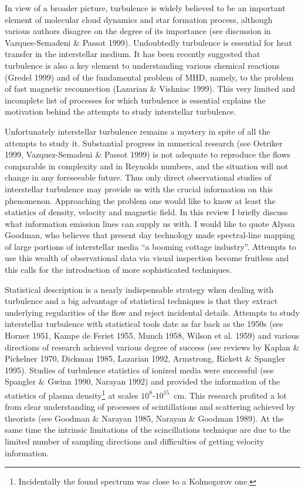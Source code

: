 In view of a broader picture, turbulence is widely believed to
be an important element of molecular cloud dynamics 
and star formation process, although various 
authors disagree on the degree of its importance (see discussion
in Vazques-Semadeni
\& Passot 1999). Undoubtedly turbulence is essential for heat 
transfer in the interstellar medium. It has been recently
suggested that turbulence
is also 
a key element to understanding various chemical reactions (Gredel 1999)
and of the fundamental problem of MHD, namely, to the problem of
fast magnetic reconnection (Lazarian \& Vishniac
1999). This very limited and incomplete list of processes for which
turbulence is essential explains the motivation behind the attempts
to study interstellar turbulence.  


Unfortunately interstellar turbulence remains a mystery in spite of all the
attempts to study it. Substantial progress in numerical research (see
Ostriker 1999, Vazquez-Semadeni \& Passot 1999) is not adequate to reproduce
the flows comparable in complexity and in Reynolds numbers, and the
situation will not change 
in any foreseeable future. Thus only direct observational 
studies of interstellar
turbulence may provide us with the crucial
information on this phenomenon. Approaching the problem one would like
to know at least the statistics of density, velocity and magnetic field.
In this review I briefly discuss what information emission lines can
supply us with. I would like to quote Alyssa Goodman, who believes
that present day technology made spectral-line
mapping of large portions of interstellar media 
``a booming cottage industry''. Attempts to use this wealth of observational
data via visual inspection become fruitless and this calls for the 
introduction of more sophisticated techniques. 


Statistical description is a nearly indispensable strategy when
dealing with turbulence and a big advantage of statistical techniques
is that they extract underlying regularities of the flow and reject
incidental details. 
Attempts to study interstellar turbulence with statistical tools
date as far back as the 1950s
(see Horner 1951, Kampe de Feriet 1955, Munch 1958, 
Wilson et al. 1959) and various directions
of research achieved various degree of success (see reviews by
Kaplan \& Pickelner 1970, Dickman 1985, Lazarian 1992, Armstrong, Rickett
\& Spangler 1995). 
Studies of turbulence statistics of ionized media were successful
(see Spangler \& Gwinn 1990, Narayan 1992) and provided the information of
the statistics of plasma density\footnote{Incidentally the found
spectrum was close to a Kolmogorov one.} at scales $10^{8}$-$10^{15}$~cm. 
This research profited
a lot from clear understanding of processes of scintillations and scattering
achieved by theorists (see Goodman \& Narayan 1985, Narayan \& Goodman 
1989). At the same time 
the intrinsic limitations of the scincillations technique
are due to the limited number of sampling directions and difficulties
of getting velocity information. 


